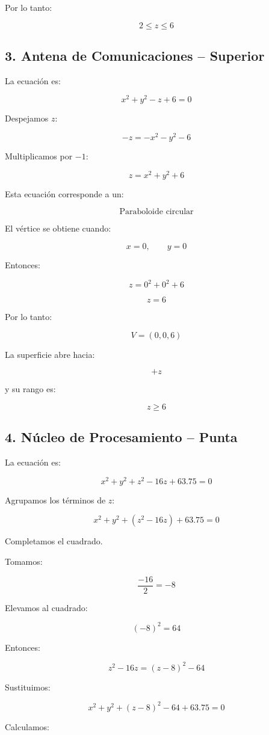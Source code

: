 \documentclass[12pt,a4paper]{article}
\begin{document}
Por lo tanto:

\[\boxed{2\leq z\leq6}\]

\subsection{3. Antena de Comunicaciones -- Superior}

La ecuación es:

\[x^2+y^2-z+6=0\]

Despejamos $z$:

\[-z=-x^2-y^2-6\]

Multiplicamos por $-1$:

\[\boxed{z=x^2+y^2+6}\]

Esta ecuación corresponde a un:

\[\boxed{\text{Paraboloide circular}}\]

El vértice se obtiene cuando:

\[x=0,\qquad y=0\]

Entonces:

\[z=0^2+0^2+6\]

\[z=6\]

Por lo tanto:

\[\boxed{V=(0,0,6)}\]

La superficie abre hacia:

\[\boxed{+z}\]

y su rango es:

\[\boxed{z\geq6}\]

\subsection{4. Núcleo de Procesamiento -- Punta}

La ecuación es:

\[x^2+y^2+z^2-16z+63.75=0\]

Agrupamos los términos de $z$:

\[x^2+y^2+(z^2-16z)+63.75=0\]

Completamos el cuadrado.

Tomamos:

\[\frac{-16}{2}=-8\]

Elevamos al cuadrado:

\[(-8)^2=64\]

Entonces:

\[z^2-16z=(z-8)^2-64\]

Sustituimos:

\[x^2+y^2+(z-8)^2-64+63.75=0\]

Calculamos:
\end{document}
